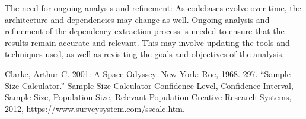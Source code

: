 \documentclass[12pt, dvipsnames, a4paper]{article}
\begin{document}
The need for ongoing analysis and refinement: As codebases evolve over time, the architecture and dependencies may change as well. Ongoing analysis and refinement of the dependency extraction process is needed to ensure that the results remain accurate and relevant. This may involve updating the tools and techniques used, as well as revisiting the goals and objectives of the analysis.






\begin{thebibliography}{00}
	 Clarke, Arthur C. 2001: A Space Odyssey. New York: Roc, 1968. 297.
	 “Sample Size Calculator.” Sample Size Calculator \- Confidence Level, Confidence Interval, Sample Size, Population Size, Relevant Population \- Creative Research Systems, 2012, https://www.surveysystem.com/sscalc.htm. 
\end{thebibliography}
\end{document}
